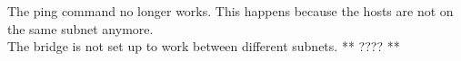 The ping command no longer works. This happens because the hosts are not on the same subnet anymore. \\
The bridge is not set up to work between different subnets. ** ???? **
